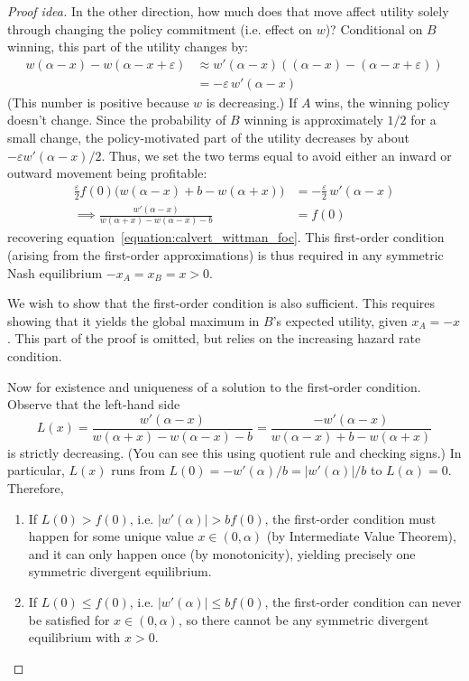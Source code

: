 \documentclass[../../../main.tex]{subfiles}
\begin{document}
\begin{theorem}
\begin{proof}[Proof idea]
        In the other direction, how much does that move affect utility solely through changing the policy commitment (i.e. effect on $w$)? 
        Conditional on $B$ winning, this part of the utility changes by:
        \begin{align*}
            w(\alpha-x)-w(\alpha-x+\varepsilon)&\approx w'(\alpha-x)((\alpha-x)-(\alpha-x+\varepsilon))\\
            &=-\varepsilon \, w'(\alpha-x)
        \end{align*} 
        (This number is positive because $w$ is decreasing.) 
        If $A$ wins, the winning policy doesn't change. 
        Since the probability of $B$ winning is approximately $1/2$ for a small change, the policy-motivated part of the utility decreases by about $-\varepsilon w'(\alpha-x)/2$.
        Thus, we set the two terms equal to avoid either an inward or outward movement being profitable:
        \begin{align*}
            \frac{\varepsilon}{2} f(0)\bigl(w(\alpha-x) + b - w(\alpha+x)\bigr) &= -\frac{\varepsilon}{2}\, w'(\alpha-x) \\
            \implies \frac{w'(\alpha-x)}{w(\alpha+x) - w(\alpha-x) - b}
                &= f(0)
        \end{align*}
        recovering equation~\eqref{equation:calvert_wittman_foc}.
        This first-order condition (arising from the first-order approximations) is thus required in any symmetric Nash equilibrium $-x_A=x_B=x>0$.

        We wish to show that the first-order condition is also sufficient. 
        This requires showing that it yields the global maximum in $B$'s expected utility, given $x_A=-x$.
        This part of the proof is omitted, but relies on the increasing hazard rate condition.
        
        Now for existence and uniqueness of a solution to the first-order condition. Observe that the left-hand side 
        \begin{equation*}
            L(x)=\frac{w'(\alpha-x)}{w(\alpha+x) - w(\alpha-x) - b}=\frac{-w'(\alpha-x)}{w(\alpha-x) + b - w(\alpha+x)}
        \end{equation*}
        is strictly decreasing. (You can see this using quotient rule and checking signs.)
        In particular, $L(x)$ runs from $L(0)=-w'(\alpha)/b=|w'(\alpha)|/b$ to $L(\alpha)=0$. 
        Therefore, 
        \begin{enumerate}
            \item If $L(0)>f(0)$, i.e. $|w'(\alpha)|>bf(0)$, the first-order condition must happen for some unique value $x\in(0,\alpha)$ (by Intermediate Value Theorem), and it can only happen once (by monotonicity), yielding precisely one symmetric divergent equilibrium.
            \item If $L(0)\leq f(0)$, i.e. $|w'(\alpha)|\leq bf(0)$, the first-order condition can never be satisfied for $x\in(0,\alpha)$, so there cannot be any symmetric divergent equilibrium with $x>0$.
        \end{enumerate}
        

\end{proof}
\end{theorem}
\end{document}

